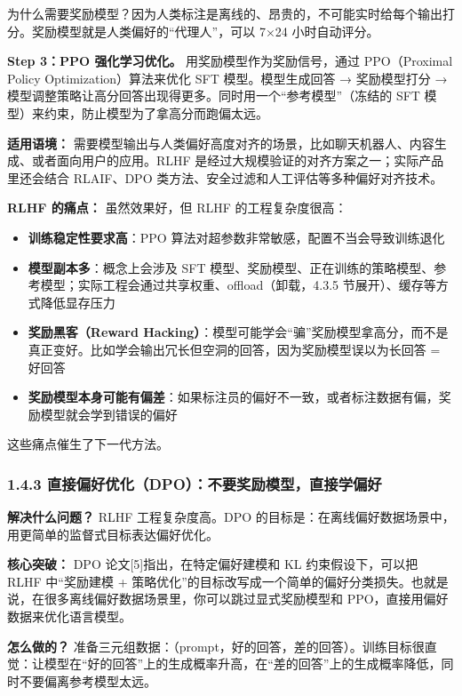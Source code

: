 \documentclass[
  chinese,
]{ctexart}
\providecommand{\tightlist}{%
  \setlength{\itemsep}{0pt}\setlength{\parskip}{0pt}}
\begin{document}
为什么需要奖励模型？因为人类标注是离线的、昂贵的，不可能实时给每个输出打分。奖励模型就是人类偏好的``代理人''，可以
7×24 小时自动评分。

\textbf{Step 3：PPO 强化学习优化。} 用奖励模型作为奖励信号，通过
PPO（Proximal Policy Optimization）算法来优化 SFT 模型。模型生成回答 →
奖励模型打分 →
模型调整策略让高分回答出现得更多。同时用一个``参考模型''（冻结的 SFT
模型）来约束，防止模型为了拿高分而跑偏太远。

\textbf{适用语境：}
需要模型输出与人类偏好高度对齐的场景，比如聊天机器人、内容生成、或者面向用户的应用。RLHF
是经过大规模验证的对齐方案之一；实际产品里还会结合 RLAIF、DPO
类方法、安全过滤和人工评估等多种偏好对齐技术。

\textbf{RLHF 的痛点：} 虽然效果好，但 RLHF 的工程复杂度很高：

\begin{itemize}
\tightlist
\item
  \textbf{训练稳定性要求高}：PPO
  算法对超参数非常敏感，配置不当会导致训练退化
\item
  \textbf{模型副本多}：概念上会涉及 SFT
  模型、奖励模型、正在训练的策略模型、参考模型；实际工程会通过共享权重、offload（卸载，4.3.5
  节展开）、缓存等方式降低显存压力
\item
  \textbf{奖励黑客（Reward
  Hacking）}：模型可能学会``骗''奖励模型拿高分，而不是真正变好。比如学会输出冗长但空洞的回答，因为奖励模型误以为长回答
  = 好回答
\item
  \textbf{奖励模型本身可能有偏差}：如果标注员的偏好不一致，或者标注数据有偏，奖励模型就会学到错误的偏好
\end{itemize}

这些痛点催生了下一代方法。

\subsubsection{1.4.3
直接偏好优化（DPO）：不要奖励模型，直接学偏好}\label{ux76f4ux63a5ux504fux597dux4f18ux5316dpoux4e0dux8981ux5956ux52b1ux6a21ux578bux76f4ux63a5ux5b66ux504fux597d}

\textbf{解决什么问题？} RLHF 工程复杂度高。DPO
的目标是：在离线偏好数据场景中，用更简单的监督式目标表达偏好优化。

\textbf{核心突破：} DPO 论文{[}5{]}指出，在特定偏好建模和 KL
约束假设下，可以把 RLHF 中``奖励建模 +
策略优化''的目标改写成一个简单的偏好分类损失。也就是说，在很多离线偏好数据场景里，你可以跳过显式奖励模型和
PPO，直接用偏好数据来优化语言模型。

\textbf{怎么做的？}
准备三元组数据：（prompt，好的回答，差的回答）。训练目标很直觉：让模型在``好的回答''上的生成概率升高，在``差的回答''上的生成概率降低，同时不要偏离参考模型太远。
\end{document}
